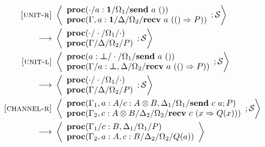 \documentclass[12pt, openany]{memoir}
\newcommand*{\send}[2]{\textbf{send}\ #1\ #2}
\newcommand*{\recv}[2]{\textbf{recv}\ #1\ #2}
\newcommand*{\procObj}[4]{\textbf{proc}(#1/#2/#3/#4)}
\newcommand*{\cancelSet}[0]{\mathcal{S}}
\begin{document}
\begin{figure}[H]
  \begin{alignat}{2}
    \label{unit-reduction-r} \textsc{[unit-r]} & ~ 
    \Braket{
      \begin{array}{l}
        \procObj{\cdot}{a : \textbf{1}}{\Omega_1}{\send{a}{()}} \\
        \procObj{\Gamma, a : \textbf{1}}{\Delta}{\Omega_2}{\recv{a}{(() \Rightarrow P)}}
      \end{array}
      ; \cancelSet
    } \tag*{} \\ ~ \longrightarrow & ~ 
    \Braket{
      \begin{array}{l}
        \procObj{\cdot}{\cdot}{\Omega_1}{\cdot} \\
        \procObj{\Gamma}{\Delta}{\Omega_2}{P}
      \end{array}
      ; \cancelSet
    } \tag*{} \\
    \label{unit-reduction-l} \textsc{[unit-l]} & ~ 
    \Braket{
      \begin{array}{l}
        \procObj{a : \boldsymbol{\bot}}{\cdot}{\Omega_1}{\send{a}{()}} \\
        \procObj{\Gamma}{a : \boldsymbol{\bot}, \Delta}{\Omega_2}{\recv{a}{(() \Rightarrow P)}}
      \end{array}
      ; \cancelSet
    } \tag*{} \\ ~ \longrightarrow & ~ 
    \Braket{
      \begin{array}{l}
        \procObj{\cdot}{\cdot}{\Omega_1}{\cdot} \\
        \procObj{\Gamma}{\Delta}{\Omega_2}{P}
      \end{array}
      ; \cancelSet
    } \tag*{} \\
    \label{channel-reduction-r} \textsc{[channel-r]} & ~ 
    \Braket{
      \begin{array}{l}
        \procObj{\Gamma_1, a : A}{c : A\otimes B, \Delta_1}{\Omega_1}{\send{c}{a}; P} \\
        \procObj{\Gamma_2, c : A \otimes B}{\Delta_2}{\Omega_2}{\recv{c}{(x \Rightarrow Q(x))}}
      \end{array}
      ; \cancelSet
    } \tag*{} \\ ~ \longrightarrow & ~ 
    \Braket{
      \begin{array}{l}
        \procObj{\Gamma_1}{c : B, \Delta_1}{\Omega_1}{P} \\
        \procObj{\Gamma_2, a : A, c : B}{\Delta_2}{\Omega_2}{Q(a)}
      \end{array}
}
\end{alignat}
\end{figure}
\end{document}
